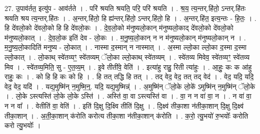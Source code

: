\documentclass[17pt]{extarticle}
\begin{document}
27. उ॒पाव॑र्तत॒ इत्यु॑प - आव॑र्तते । . परि॑ श्रयति श्रयति॒ परि॒ परि॑ श्रयति । . श्र॒य॒ त्य॒न्तर्.हि॑तो॒ ऽन्तर्.हि॑तः श्रयति श्रय त्य॒न्तर्.हि॑तः । . अ॒न्तर्.हि॑तो॒ हि ह्य॑न्तर्.हि॑तो॒ ऽन्तर्.हि॑तो॒ हि । . अ॒न्तर्.हि॑त॒ इत्य॒न्तः - हि॒तः॒ । . हि दे॑वलो॒को दे॑वलो॒को हि हि दे॑वलो॒कः । . दे॒व॒लो॒को म॑नुष्यलो॒कान् म॑नुष्यलो॒काद् दे॑वलो॒को दे॑वलो॒को म॑नुष्यलो॒कात् । . दे॒व॒लो॒क इति॑ देव - लो॒कः । . म॒नु॒ष्य॒लो॒कान् न न म॑नुष्यलो॒कान् म॑नुष्यलो॒कान् न । . म॒नु॒ष्य॒लो॒कादिति॑ मनुष्य - लो॒कात् । . नास्मा द॒स्मान् न नास्मात् । . अ॒स्मा ल्लो॒का ल्लो॒का द॒स्मा द॒स्मा ल्लो॒कात् । . लो॒काथ् स्वे॑तव्यꣳ॒॒ स्वे॑तव्यम् ॅलो॒का ल्लो॒काथ् स्वे॑तव्यम् । . स्वे॑तव्य मिवेव॒ स्वे॑तव्यꣳ॒॒ स्वे॑तव्य मिव । . स्वे॑तव्य॒मिति॒ सु - ए॒त॒व्य॒म् । . इ॒वे तीती॑वे॒ वेति॑ । . इत्या॑हु राहु॒ रिती त्या॑हुः । . आ॒हुः॒ कः क आ॑हु राहुः॒ कः । . को हि हि कः को हि । . हि तत् तद्धि हि तत् । . तद् वेद॒ वेद॒ तत् तद् वेद॑ । . वेद॒ यदि॒ यदि॒ वेद॒ वेद॒ यदि॑ । . यद्य॒मुष्मि॑न् न॒मुष्मि॒न्॒. यदि॒ यद्य॒मुष्मिन्न्॑ । . अ॒मुष्मि॑न् ॅलो॒के लो॒के॑ ऽमुष्मि॑न् न॒मुष्मि॑न् ॅलो॒के । . लो॒के ऽस्त्यस्ति॑ लो॒के लो॒के ऽस्ति॑ । . अस्ति॑ वा॒ वा ऽस्त्यस्ति॑ वा । . वा॒ न न वा॑ वा॒ न । . न वा॑ वा॒ न न वा᳚ । . वेतीति॑ वा॒ वेति॑ । . इति॑ दि॒क्षु दि॒क्ष्वि तीति॑ दि॒क्षु । . दि॒क्ष्व॑ तीका॒शा न॑तीका॒शान् दि॒क्षु दि॒क्ष्व॑ तीका॒शान् । . अ॒ती॒का॒शान् क॑रोति करोत्य तीका॒शा न॑तीका॒शान् क॑रोति । . क॒रो॒ त्यु॒भयो॑ रु॒भयोः᳚ करोति करो त्यु॒भयोः᳚ । \newline
\end{document}
